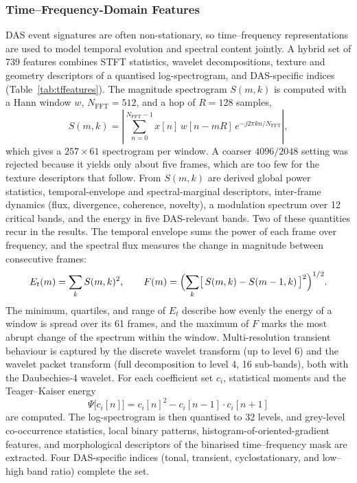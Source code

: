 \subsubsection{Time--Frequency-Domain Features}
\label{sec:chap3TFFeatures}
DAS event signatures are often non-stationary, so time--frequency representations are used to model temporal evolution and spectral content jointly. A hybrid set of 739 features combines STFT statistics, wavelet decompositions, texture and geometry descriptors of a quantised log-spectrogram, and DAS-specific indices (Table~\ref{tab:tffeatures}). The magnitude spectrogram $S(m,k)$ is computed with a Hann window $w$, $N_{\mathrm{FFT}} = 512$, and a hop of $R = 128$ samples,
\begin{equation}
	S(m,k) = \left| \sum_{n=0}^{N_{\mathrm{FFT}}-1} x[n]\, w[n - mR]\, e^{-j 2\pi k n / N_{\mathrm{FFT}}} \right|,
	\label{eq:stft}
\end{equation}
which gives a $257 \times 61$ spectrogram per window. A coarser $4096/2048$ setting was rejected because it yields only about five frames, which are too few for the texture descriptors that follow. From $S(m,k)$ are derived global power statistics, temporal-envelope and spectral-marginal descriptors, inter-frame dynamics (flux, divergence, coherence, novelty), a modulation spectrum over 12 critical bands, and the energy in five DAS-relevant bands. Two of these quantities recur in the results. The temporal envelope sums the power of each frame over frequency, and the spectral flux measures the change in magnitude between consecutive frames:
\begin{equation}
	E_t(m) = \sum_{k} S(m,k)^2, \qquad F(m) = \Bigl( \sum_{k} \bigl[\, S(m,k) - S(m-1,k) \,\bigr]^2 \Bigr)^{1/2}.
	\label{eq:envelopeflux}
\end{equation}
The minimum, quartiles, and range of $E_t$ describe how evenly the energy of a window is spread over its 61 frames, and the maximum of $F$ marks the most abrupt change of the spectrum within the window. Multi-resolution transient behaviour is captured by the discrete wavelet transform (up to level 6) and the wavelet packet transform (full decomposition to level 4, 16 sub-bands), both with the Daubechies-4 wavelet. For each coefficient set $c_i$, statistical moments and the Teager--Kaiser energy
\begin{equation}
	\Psi\bigl[c_i[n]\bigr] = c_i[n]^2 - c_i[n-1]\cdot c_i[n+1]
	\label{eq:tkeo}
\end{equation}
are computed. The log-spectrogram is then quantised to 32 levels, and grey-level co-occurrence statistics, local binary patterns, histogram-of-oriented-gradient features, and morphological descriptors of the binarised time--frequency mask are extracted. Four DAS-specific indices (tonal, transient, cyclostationary, and low--high band ratio) complete the set.

